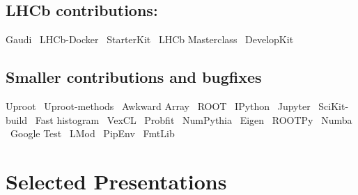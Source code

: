 \documentclass[10pt,letterpaper,english]{moderncv}
\begin{document}
\subsection{LHCb contributions:}
	Gaudi \bullet\ 
	LHCb-Docker \bullet\ 
	StarterKit \bullet\ 
	LHCb Masterclass \bullet\ 
	DevelopKit

\subsection{Smaller contributions and bugfixes}
	Uproot  \bullet\ 
	Uproot-methods \bullet\ 
	Awkward Array \bullet\ 
	ROOT \bullet\ 
	IPython \bullet\ 
	Jupyter \bullet\ 
	SciKit-build \bullet\ 
	Fast histogram \bullet\  
	VexCL \bullet\ 
	Probfit  \bullet\ 
	NumPythia \bullet\ 
	Eigen  \bullet\ 
    ROOTPy \bullet\ 
    Numba \bullet\  
    Google Test  \bullet\ 
    LMod \bullet\
    PipEnv \bullet\ 
    FmtLib



\section{Selected Presentations}
\end{document}
